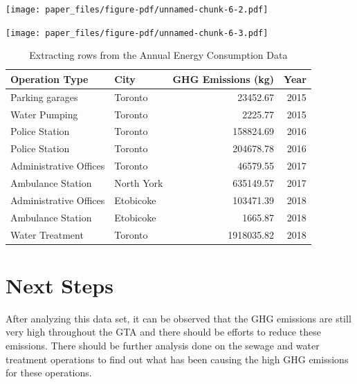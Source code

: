 \documentclass[
  letterpaper,
  DIV=11,
  numbers=noendperiod]{scrartcl}
\begin{document}
\texttt{[image: paper\_files/figure-pdf/unnamed-chunk-6-2.pdf]}

\texttt{[image: paper\_files/figure-pdf/unnamed-chunk-6-3.pdf]}

\begin{table}[H]

\caption{Extracting rows from the Annual Energy Consumption Data}
\centering
\fontsize{10}{12}\selectfont
\begin{tabular}[t]{llrr}
\toprule
Operation Type & City & GHG Emissions (kg) & Year\\
\midrule
Parking garages & Toronto & 23452.67 & 2015\\
Water Pumping & Toronto & 2225.77 & 2015\\
Police Station & Toronto & 158824.69 & 2016\\
Police Station & Toronto & 204678.78 & 2016\\
Administrative Offices & Toronto & 46579.55 & 2017\\
Ambulance Station & North York & 635149.57 & 2017\\
Administrative Offices & Etobicoke & 103471.39 & 2018\\
Ambulance Station & Etobicoke & 1665.87 & 2018\\
Water Treatment & Toronto & 1918035.82 & 2018\\
\bottomrule
\end{tabular}
\end{table}

\hypertarget{next-steps}{%
\section{Next Steps}\label{next-steps}}

After analyzing this data set, it can be observed that the GHG emissions
are still very high throughout the GTA and there should be efforts to
reduce these emissions. There should be further analysis done on the
sewage and water treatment operations to find out what has been causing
the high GHG emissions for these operations.
\end{document}
